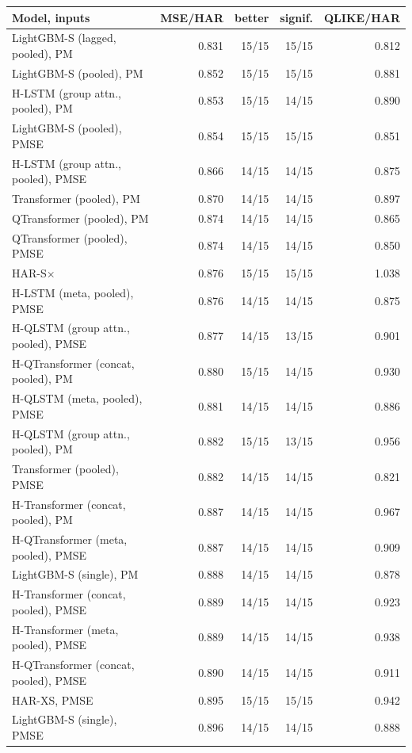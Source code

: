 \begin{tabular}{lrrrr}
\toprule
Model, inputs & MSE/HAR & better & signif. & QLIKE/HAR \\
\midrule
LightGBM-S (lagged, pooled), PM & 0.831 & 15/15 & 15/15 & 0.812 \\
LightGBM-S (pooled), PM & 0.852 & 15/15 & 15/15 & 0.881 \\
H-LSTM (group attn., pooled), PM & 0.853 & 15/15 & 14/15 & 0.890 \\
LightGBM-S (pooled), PMSE & 0.854 & 15/15 & 15/15 & 0.851 \\
H-LSTM (group attn., pooled), PMSE & 0.866 & 14/15 & 14/15 & 0.875 \\
Transformer (pooled), PM & 0.870 & 14/15 & 14/15 & 0.897 \\
QTransformer (pooled), PM & 0.874 & 14/15 & 14/15 & 0.865 \\
QTransformer (pooled), PMSE & 0.874 & 14/15 & 14/15 & 0.850 \\
HAR-S$\times$ & 0.876 & 15/15 & 15/15 & 1.038 \\
H-LSTM (meta, pooled), PMSE & 0.876 & 14/15 & 14/15 & 0.875 \\
H-QLSTM (group attn., pooled), PMSE & 0.877 & 14/15 & 13/15 & 0.901 \\
H-QTransformer (concat, pooled), PM & 0.880 & 15/15 & 14/15 & 0.930 \\
H-QLSTM (meta, pooled), PMSE & 0.881 & 14/15 & 14/15 & 0.886 \\
H-QLSTM (group attn., pooled), PM & 0.882 & 15/15 & 13/15 & 0.956 \\
Transformer (pooled), PMSE & 0.882 & 14/15 & 14/15 & 0.821 \\
H-Transformer (concat, pooled), PM & 0.887 & 14/15 & 14/15 & 0.967 \\
H-QTransformer (meta, pooled), PMSE & 0.887 & 14/15 & 14/15 & 0.909 \\
LightGBM-S (single), PM & 0.888 & 14/15 & 14/15 & 0.878 \\
H-Transformer (concat, pooled), PMSE & 0.889 & 14/15 & 14/15 & 0.923 \\
H-Transformer (meta, pooled), PMSE & 0.889 & 14/15 & 14/15 & 0.938 \\
H-QTransformer (concat, pooled), PMSE & 0.890 & 14/15 & 14/15 & 0.911 \\
HAR-XS, PMSE & 0.895 & 15/15 & 15/15 & 0.942 \\
LightGBM-S (single), PMSE & 0.896 & 14/15 & 14/15 & 0.888 \\

\end{tabular}
